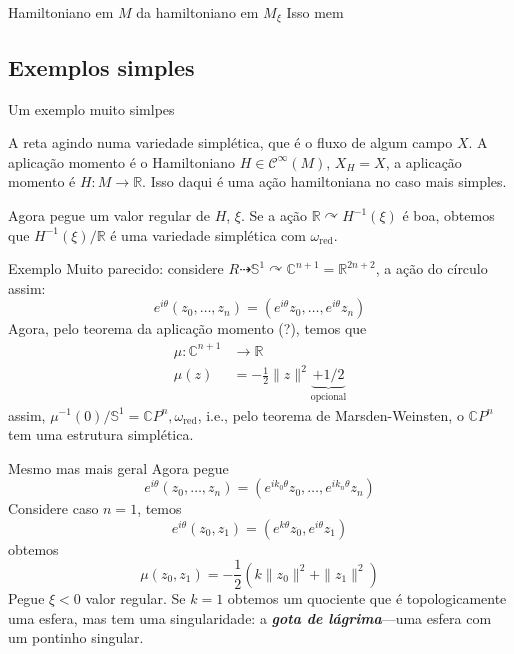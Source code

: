 \begin{thing6}{Hamiltoniano em $M$ da hamiltoniano em $M_\xi$}\leavevmode
	Isso mem
\end{thing6}

\subsection{Exemplos simples}

\begin{thing4}{Um exemplo muito simlpes}\leavevmode
	
A reta agindo numa variedade simplética, que é o fluxo de algum campo $X$. A aplicação momento é o Hamiltoniano $H\in\mathcal{C}^\infty(M)$, $X_H=X$, a aplicação momento é $H:M\longrightarrow \mathbb{R}$. Isso daqui é uma ação hamiltoniana no caso mais simples.

Agora pegue um valor regular de  $H$, $\xi$. Se a ação $\mathbb{R}\curvearrowright H^{-1}(\xi)$ é boa, obtemos que $H^{-1}(\xi)/\mathbb{R}$ é uma variedade simplética com $\omega_{\operatorname{red}}$.
\end{thing4}

\begin{thing3}{Exemplo}\leavevmode
	Muito parecido: considere $R\dashrightarrow \mathbb{S}^1\curvearrowright \mathbb{C}^{n+1}=\mathbb{R}^{2n+2}$, a ação do círculo assim:
	\[e^{i\theta}(z_0,\ldots,z_n)=(e^{i\theta}z_0,\ldots,e^{i\theta}z_n)\]
Agora, pelo teorema da aplicação momento (?), temos que
\begin{align*}
	\mu: \mathbb{C}^{n+1} &\longrightarrow \mathbb{R} \\
	\mu(z) &=-\frac{1}{2}\|z\|^2\underbrace{+1/2}_{\text{opcional} }
\end{align*}
assim, $\mu^{-1}(0)/\mathbb{S}^1=\mathbb{C}P^{n},\omega_{\operatorname{red}}$, i.e., {\color{3}pelo teorema de Marsden-Weinsten, o $\mathbb{C}P^{n}$ tem uma estrutura simplética}.
\end{thing3}

\begin{thing4}{Mesmo mas mais geral}\leavevmode
	Agora pegue
	\[e^{i\theta}(z_0,\ldots,z_n)=(e^{ik_0\theta}z_0,\ldots,e^{ik_n\theta}z_n)\]
	Considere caso $n=1$, temos
	\[e^{i\theta}(z_0,z_1)=(e^{k\theta}z_0,e^{i\theta}z_1)\]
	obtemos
	\[\mu(z_0,z_1)=-\frac{1}{2}\left( k\|z_0\|^2+\|z_1\|^2 \right) \]
	Pegue $\xi<0$ valor regular. Se $k=1$ obtemos um quociente que  é topologicamente uma esfera, mas tem uma singularidade: a \textit{\textbf{gota de lágrima}}---uma esfera com um pontinho singular.
\end{thing4}

